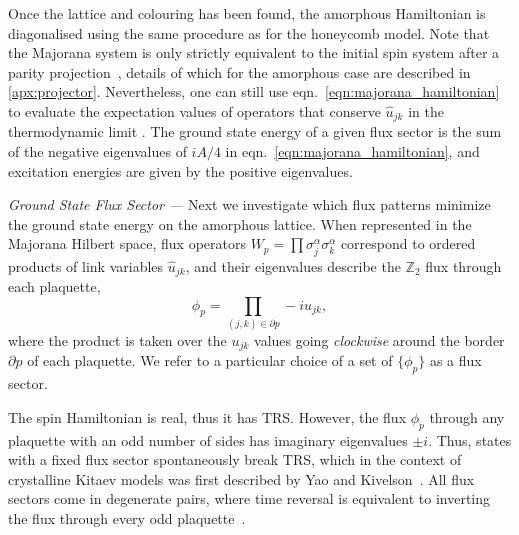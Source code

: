 \documentclass[%
 reprint,
superscriptaddress,
 amsmath,amssymb,
aps,
]{revtex4-2}
\begin{document}
Once the lattice and colouring has been found, the amorphous Hamiltonian is diagonalised using the same procedure as for the honeycomb model. Note that the Majorana system is only strictly equivalent to the initial spin system after a parity projection~\cite{pedrocchiPhysicalSolutionsKitaev2011, Yao2009}, details of which for the amorphous case are described in \cref{apx:projector}. Nevertheless, one can still use eqn.~\ref{eqn:majorana_hamiltonian} to evaluate the expectation values of operators that conserve $\hat u_{jk}$ in the thermodynamic limit \cite{zschocke2015physical,knolle_dynamics_2016}. The ground state energy of a given flux sector is the sum of the negative eigenvalues of $iA/4$ in eqn.~\ref{eqn:majorana_hamiltonian}, and excitation energies are given by the positive eigenvalues. 

{\it Ground State Flux Sector ---} 
Next we investigate which flux patterns minimize the ground state energy on the amorphous lattice. When represented in the Majorana Hilbert space, flux operators $ W_p = \prod \sigma_j^{\alpha}\sigma_k^{\alpha}$ correspond to ordered products of link variables $\hat u_{jk}$, and their eigenvalues describe the $\mathbb Z_2$ flux through each plaquette,
\begin{equation} \label{eqn:flux_definition}
    \phi_p = \prod_{(j,k) \in \partial p} -iu_{jk},
\end{equation}
where the product is taken over the $u_{jk}$ values going \textit{clockwise} around the border $\partial p$ of each plaquette. We refer to a particular choice of a set of $\{ \phi_p\}$ as a flux sector.\par
The spin Hamiltonian is real, thus it has TRS. However, the flux $\phi_p$ through any plaquette with an odd number of sides has imaginary eigenvalues $\pm i$. Thus, states with a fixed flux sector spontaneously break TRS, which in the context of crystalline Kitaev models was first described by Yao and Kivelson~\cite{Yao2011}. All flux sectors come in degenerate pairs, where time reversal is equivalent to inverting the flux through every odd plaquette~\cite{yaoExactChiralSpin2007, Peri2020}.
\end{document}
